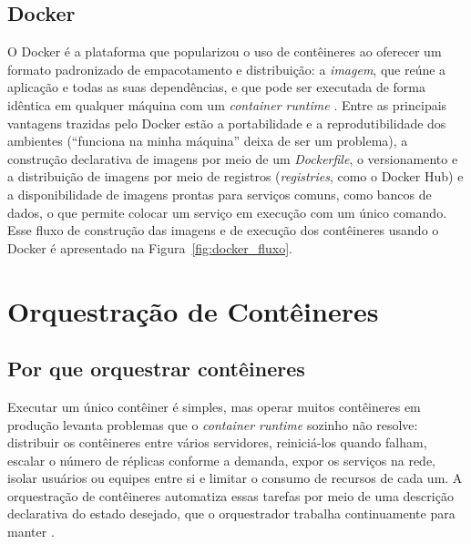 \subsection{Docker}
\label{sec:docker}

O Docker é a plataforma que popularizou o uso de contêineres ao oferecer um formato padronizado de empacotamento e distribuição: a \textit{imagem}, que reúne a aplicação e todas as suas dependências, e que pode ser executada de forma idêntica em qualquer máquina com um \textit{container runtime} \cite{dockerDocs:online}. Entre as principais vantagens trazidas pelo Docker estão a portabilidade e a reprodutibilidade dos ambientes (``funciona na minha máquina'' deixa de ser um problema), a construção declarativa de imagens por meio de um \textit{Dockerfile}, o versionamento e a distribuição de imagens por meio de registros (\textit{registries}, como o Docker Hub) e a disponibilidade de imagens prontas para serviços comuns, como bancos de dados, o que permite colocar um serviço em execução com um único comando. Esse fluxo de construção das imagens e de execução dos contêineres usando o Docker é apresentado na Figura~\ref{fig:docker_fluxo}.



\section{Orquestração de Contêineres}
\label{sec:orquestracao}

\subsection{Por que orquestrar contêineres}

\par Executar um único contêiner é simples, mas operar muitos contêineres em produção levanta problemas que o \textit{container runtime} sozinho não resolve: distribuir os contêineres entre vários servidores, reiniciá-los quando falham, escalar o número de réplicas conforme a demanda, expor os serviços na rede, isolar usuários ou equipes entre si e limitar o consumo de recursos de cada um. A orquestração de contêineres automatiza essas tarefas por meio de uma descrição declarativa do estado desejado, que o orquestrador trabalha continuamente para manter \cite{kubernetesDocs:online}.

